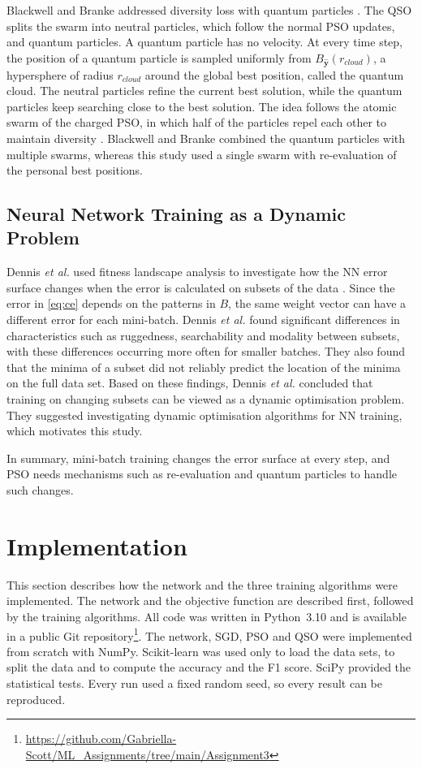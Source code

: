 \documentclass[conference]{IEEEtran}
\begin{document}
Blackwell and Branke addressed diversity loss with quantum particles
\cite{blackwell2006}. The QSO splits the swarm into neutral particles,
which follow the normal PSO updates, and quantum particles. A quantum
particle has no velocity. At every time step, the position of a
quantum particle is sampled uniformly from $B_{\hat{\mathbf{y}}}(r_{cloud})$,
a hypersphere of radius $r_{cloud}$ around the global best position,
called the quantum cloud. The
neutral particles refine the current best solution, while the quantum
particles keep searching close to the best solution. The idea follows
the atomic swarm of the charged PSO, in which half of the particles
repel each other to maintain diversity
\cite{engelbrecht2007}. Blackwell and Branke combined
the quantum particles with multiple swarms, whereas this study used a
single swarm with re-evaluation of the personal best positions.

\subsection{Neural Network Training as a Dynamic Problem}
Dennis \textit{et al.} used fitness landscape analysis to investigate how 
the NN error surface changes when the error is calculated on subsets of the 
data \cite{dennis2021}. Since the error in \eqref{eq:ce} depends on the 
patterns in $B$, the same weight vector can have a different error for each 
mini-batch. Dennis \textit{et al.} found significant differences in 
characteristics such as ruggedness, searchability and modality between 
subsets, with these differences occurring more often for smaller batches. 
They also found that the minima of a subset did not reliably predict the 
location of the minima on the full data set. Based on these findings, 
Dennis \textit{et al.} concluded that training on changing subsets can be 
viewed as a dynamic optimisation problem. They suggested investigating 
dynamic optimisation algorithms for NN training, which motivates this study.

In summary, mini-batch training changes the error surface at every
step, and PSO needs mechanisms such as re-evaluation and quantum
particles to handle such changes.

\section{Implementation}
\label{sec:impl}
This section describes how the network and the three training
algorithms were implemented. The network and the objective function
are described first, followed by the training algorithms. All code
was written in Python~3.10 and is available in a public Git
repository\footnote{\url{https://github.com/Gabriella-Scott/ML_Assignments/tree/main/Assignment3}}.
The network, SGD, PSO and QSO were implemented from scratch with
NumPy. Scikit-learn was used only to load the data sets, to split the
data and to compute the accuracy and the F1 score. SciPy provided the statistical
tests. Every run used a fixed random seed, so every result can be
reproduced.
\end{document}
